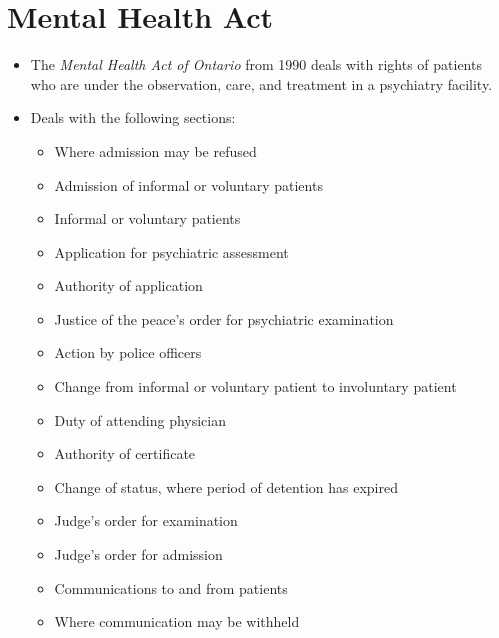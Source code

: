 \documentclass{article}
\begin{document}
\section{Mental Health Act}
\begin{itemize}
    \item The \emph{Mental Health Act of Ontario} from 1990 deals with rights of patients who are under the observation, care, and treatment in a psychiatry facility.
    \item Deals with the following sections:
        \begin{itemize}
            \item Where admission may be refused
            \item Admission of informal or voluntary patients
            \item Informal or voluntary patients
            \item Application for psychiatric assessment
            \item Authority of application
            \item Justice of the peace's order for psychiatric examination
            \item Action by police officers
            \item Change from informal or voluntary patient to involuntary patient
            \item Duty of attending physician
            \item Authority of certificate
            \item Change of status, where period of detention has expired
            \item Judge's order for examination
            \item Judge's order for admission
            \item Communications to and from patients
            \item Where communication may be withheld
        \end{itemize}
\end{itemize}
\end{document}
